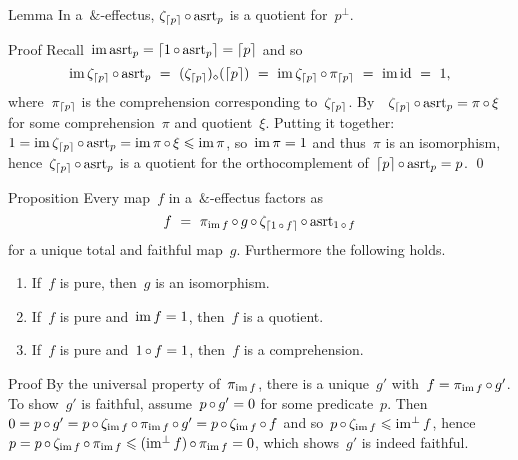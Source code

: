 \documentclass[b]{subfiles}
\begin{document}
\begin{parsec}%
\begin{point}{Lemma}%
    In a~$\&$-effectus,
    $\zeta_{\left\lceil p\right\rceil} \mathop{\circ} \mathrm{asrt}_p$
    is a quotient for~$p^\perp$.
\begin{point}{Proof}%
Recall~$\operatorname{im} \mathrm{asrt}_p = \left\lceil1 \mathop{\circ} \mathrm{asrt}_p\right\rceil = \left\lceil p\right\rceil$ and so
\begin{equation*}
\operatorname{im} \zeta_{\left\lceil p\right\rceil} \mathop{\circ} \mathrm{asrt}_p
\ =\  (\zeta_{\left\lceil p\right\rceil})_\diamond( \left\lceil p\right\rceil)
\ =\  \operatorname{im} \zeta_{\left\lceil p\right\rceil} \mathop{\circ} \pi_{\left\lceil p\right\rceil}
\ =\  \operatorname{im} \operatorname{id} \ =\  1,
\end{equation*}
where~$\pi_{\left\lceil p\right\rceil}$ is the comprehension corresponding to~$\zeta_{\left\lceil p\right\rceil}$.
By~~$\zeta_{\left\lceil p\right\rceil} \mathop{\circ} \mathrm{asrt}_p = \pi \mathop{\circ} \xi$
    for some comprehension~$\pi$ and quotient~$\xi$.
Putting it together:
$1 = \operatorname{im} \zeta_{\left\lceil p\right\rceil} \mathop{\circ} \mathrm{asrt}_p = \operatorname{im} \pi \mathop{\circ} \xi \leqslant \operatorname{im} \pi$,
so~$\operatorname{im} \pi = 1$ and thus~$\pi$ is an isomorphism,
hence~$\zeta_{\left\lceil p\right\rceil}\mathop{\circ} \mathrm{asrt}_p$
is a quotient for the orthocomplement of~$\left\lceil p\right\rceil \mathop{\circ} \mathrm{asrt}_p = p$. \qed
\end{point}
\end{point}
\begin{point}{Proposition}%
Every map~$f$
in a~$\&$-effectus
factors as
\begin{equation}\label{eq-standard-form-map}
        f \ =\ \pi_{\operatorname{im} f} \mathop{\circ} g \mathop{\circ} \zeta_{\left\lceil1 \mathop{\circ} f\right\rceil} \mathop{\circ} \mathrm{asrt}_{1 \mathop{\circ} f} 
    \end{equation}
    for a unique total and faithful map~$g$.
Furthermore the following holds.
\begin{enumerate}
\item
If~$f$ is pure, then~$g$ is an isomorphism.
\item
If~$f$ is pure and~$\operatorname{im} f = 1$, then~$f$ is a quotient.
\item
If~$f$ is pure and~$1 \mathop{\circ} f = 1$, then~$f$ is a comprehension.
\end{enumerate}
\begin{point}{Proof}%
By the universal property of~$\pi_{\operatorname{im} f}$,
    there is a unique~$g'$ with~$f = \pi_{\operatorname{im} f} \mathop{\circ} g'$.
To show~$g'$ is faithful, assume~$p\mathop{\circ} g' = 0$
    for some predicate~$p$.
Then~$0 = p \mathop{\circ} g' = p \mathop{\circ} \zeta_{\operatorname{im} f} \mathop{\circ} \pi_{\operatorname{im} f} \mathop{\circ} g'
                = p \mathop{\circ} \zeta_{\operatorname{im} f} \mathop{\circ} f$
    and so~$p \mathop{\circ} \zeta_{\operatorname{im} f} \leqslant \operatorname{im^\perp} f$,
    hence~$p = p \mathop{\circ} \zeta_{\operatorname{im} f} \mathop{\circ} \pi_{\operatorname{im} f}
                \leqslant (\operatorname{im^\perp} f )\mathop{\circ} \pi_{\operatorname{im} f} = 0$, which
                shows~$g'$ is indeed faithful.


\end{point}
\end{point}
\end{parsec}
\end{document}
